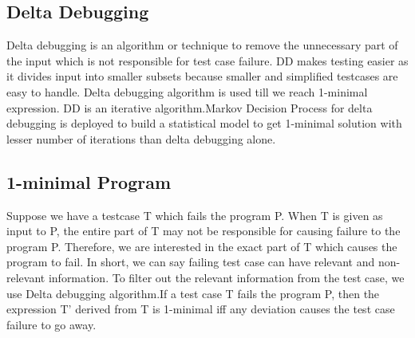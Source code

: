 \documentclass{relatorio}
\begin{document}
\subsection{Delta Debugging}%
\label{Tools}

Delta debugging is an algorithm or technique to remove the unnecessary part of the input which is not responsible for test case failure. DD makes testing easier as it divides input into smaller subsets because smaller  and simplified testcases are easy to handle. Delta debugging algorithm is used till we reach 1-minimal expression. DD is an iterative algorithm.Markov Decision Process for delta debugging is deployed to build a statistical model to get 1-minimal solution with lesser number of iterations than delta debugging alone.


\subsection{1-minimal Program}%
\label{Tools}

Suppose we have a testcase T which fails the program P. When T is given as input to P, the entire part of T may not be responsible for causing failure to the program P. Therefore, we are interested in the exact part of T which causes the program to fail. In short, we can say failing test case can have relevant and non-relevant information. To filter out the relevant information from the test case, we use Delta debugging algorithm.If a test case T fails the program P, then the expression T’ derived from T is 1-minimal iff any deviation causes the test case failure to go away.
\end{document}
